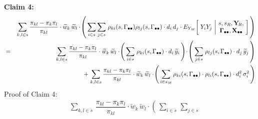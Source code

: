 \begin{enumerate}
    \vskip 0.3cm
    \noindent
    \textbf{Claim 4:}\quad
    \begin{eqnarray*}
    &&
        \underset{k,l \in s}{\sum}\,
        \dfrac{\pi_{kl} - \pi_{k}\pi_{l}}{\pi_{kl}}
        \cdot
        \widetilde{w}_{k}\,\widetilde{w}_{l}
        \cdot\!
        \left(\,
            \underset{i \in s}{\sum}\,
            \underset{j \in s}{\sum}\;
            \rho_{ki}(s,\gdotdot)\rho_{lj}(s,\gdotdot)
            \cdot
            d_{i}\,d_{j}
            \cdot
            E_{Y_{M}}\!\left[\;
                    Y_{i}
                    Y_{j}
                \,\left\vert\!
                \begin{array}{c} s,s_{R},\YsubR, \\ \Gdotdot,\Xobs \end{array}
                \right.
                \!\!\right]
            \,\right)
    \\
    & = &
        \underset{k,l \in s}{\sum}\,
        \dfrac{\pi_{kl} - \pi_{k}\pi_{l}}{\pi_{kl}}
        \cdot
        \widetilde{w}_{k}\,\widetilde{w}_{l}
        \cdot\!
        \left(\,
            \underset{i \in s}{\sum}\;
            \rho_{ki}(s,\gdotdot)
            \cdot
            d_{i}\,\widetilde{y}_{i}
            \,\right)
        \!\cdot\!
        \left(\,
            \underset{j \in s}{\sum}\;
            \rho_{lj}(s,\gdotdot)
            \cdot
            d_{j}\,\widetilde{y}_{j}
            \,\right)
    \\
    &&
        \; + \;
        \underset{k,l \in s}{\sum}\,
        \dfrac{\pi_{kl} - \pi_{k}\pi_{l}}{\pi_{kl}}
        \cdot
        \widetilde{w}_{k}\,\widetilde{w}_{l}
        \cdot\!
        \left(\,
            \underset{i \in {\color{black}s_{M}} }{\sum}\,
            \rho_{ki}(s,\gdotdot)
            \cdot
            \rho_{li}(s,\gdotdot)
            \cdot
            d_{i}^{2}\,\sigma_{i}^{2}
            \,\right)
    \end{eqnarray*}
    Proof of Claim 4:\;\;
    \begin{eqnarray*}
    &&
        \underset{k,l \in s}{\sum}\,
        \dfrac{\pi_{kl} - \pi_{k}\pi_{l}}{\pi_{kl}}
        \cdot
        \widetilde{w}_{k}\,\widetilde{w}_{l}
        \cdot\!
        \left(\,
            \underset{i \in s}{\sum}\,
            \underset{j \in s}{\sum}\;

\end{eqnarray*}
\end{enumerate}
